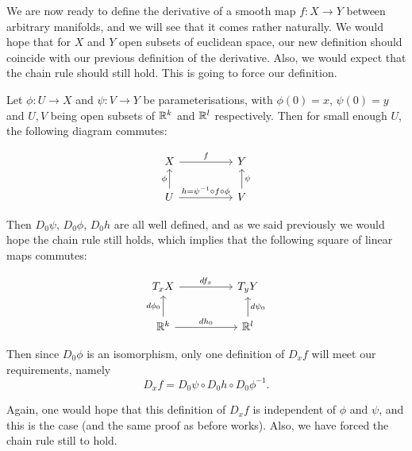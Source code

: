 \documentclass[a4paper]{scrartcl}
\begin{document}
We are now ready to define the derivative of a smooth map $f: X \rightarrow Y$ between arbitrary manifolds, and we will see that it comes rather naturally. We would hope that for $X$ and $Y$ open subsets of euclidean space, our new definition should coincide with our previous definition of the derivative. Also, we would expect that the chain rule should still hold. This is going to force our definition.

Let $\phi: U \rightarrow X$ and $\psi: V \rightarrow Y$ be parameterisations, with $\phi(0) = x$, $\psi(0) = y$ and $U, V$ being open subsets of $\mathbb{R}^k$ and $\mathbb{R}^l$ respectively. Then for small enough $U$, the following diagram commutes:

\[\begin{tikzcd}
	X && Y \\
	U && V
	\arrow["f", from=1-1, to=1-3]
	\arrow["\phi", from=2-1, to=1-1]
	\arrow["\psi"', from=2-3, to=1-3]
	\arrow["{h=\psi^{-1} \circ f \circ \phi}", from=2-1, to=2-3]
\end{tikzcd}\]

Then $D_0 \psi$, $D_0 \phi$, $D_0 h$ are all well defined, and as we said previously we would hope the chain rule still holds, which implies that the following square of linear maps commutes:

\[\begin{tikzcd}
	{T_xX} && {T_yY} \\
	{\R^k} && {\R^l}
	\arrow["{df_x}", from=1-1, to=1-3]
	\arrow["{d\phi_0}", from=2-1, to=1-1]
	\arrow["{d\psi_0}"', from=2-3, to=1-3]
	\arrow["{dh_0}", from=2-1, to=2-3]
\end{tikzcd}\]

Then since $D_0 \phi$ is an isomorphism, only one definition of $D_x f$ will meet our requirements, namely
$$
D_x f = D_0 \psi \circ D_0 h \circ D_0 \phi^{-1}.
$$

Again, one would hope that this definition of $D_x f$ is independent of $\phi$ and $\psi$, and this is the case (and the same proof as before works). Also, we have forced the chain rule still to hold.
\end{document}
